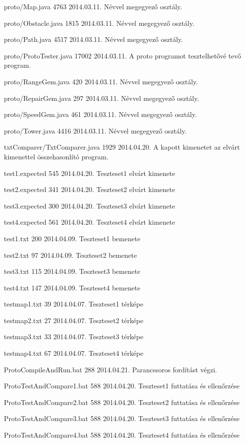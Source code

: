\begin{fajllista}
\fajl
{proto/Map.java}
{4763}
{2014.03.11.}
{Névvel megegyező osztály.}

\fajl
{proto/Obstacle.java}
{1815}
{2014.03.11.}
{Névvel megegyező osztály.}

\fajl
{proto/Path.java}
{4517}
{2014.03.11.}
{Névvel megegyező osztály.}

\fajl
{proto/ProtoTester.java}
{17002}
{2014.03.11.}
{A proto programot tesztelhetővé tevő program.}

\fajl
{proto/RangeGem.java}
{420}
{2014.03.11.}
{Névvel megegyező osztály.}

\fajl
{proto/RepairGem.java}
{297}
{2014.03.11.}
{Névvel megegyező osztály.}

\fajl
{proto/SpeedGem.java}
{461}
{2014.03.11.}
{Névvel megegyező osztály.}

\fajl
{proto/Tower.java}
{4416}
{2014.03.11.}
{Névvel megegyező osztály.}

\fajl
{txtComparer/TxtComparer.java}
{1929}
{2014.04.20.}
{A kapott kimenetet az elvárt kimenettel összehasonlító program.}

\fajl
{test1.expected}
{545}
{2014.04.20.}
{Teszteset1 elvárt kimenete}

\fajl
{test2.expected}
{341}
{2014.04.20.}
{Teszteset2 elvárt kimenete}

\fajl
{test3.expected}
{300}
{2014.04.20.}
{Teszteset3 elvárt kimenete}

\fajl
{test4.expected}
{561}
{2014.04.20.}
{Teszteset4 elvárt kimenete}

\fajl
{test1.txt}
{200}
{2014.04.09.}
{Teszteset1 bemenete}

\fajl
{test2.txt}
{97}
{2014.04.09.}
{Teszteset2 bemenete}

\fajl
{test3.txt}
{115}
{2014.04.09.}
{Teszteset3 bemenete}

\fajl
{test4.txt}
{147}
{2014.04.09.}
{Teszteset4 bemenete}

\fajl
{testmap1.txt}
{39}
{2014.04.07.}
{Teszteset1 térképe}

\fajl
{testmap2.txt}
{27}
{2014.04.07.}
{Teszteset2 térképe}

\fajl
{testmap3.txt}
{33}
{2014.04.07.}
{Teszteset3 térképe}

\fajl
{testmap4.txt}
{67}
{2014.04.07.}
{Teszteset4 térképe}

\fajl
{ProtoCompileAndRun.bat}
{288}
{2014.04.21.}
{Parancssoros fordítást végzi.}

\fajl
{ProtoTestAndCompare1.bat}
{588}
{2014.04.20.}
{Teszteset1 futtatása és ellenőrzése}

\fajl
{ProtoTestAndCompare2.bat}
{588}
{2014.04.20.}
{Teszteset2 futtatása és ellenőrzése}

\fajl
{ProtoTestAndCompare3.bat}
{588}
{2014.04.20.}
{Teszteset3 futtatása és ellenőrzése}

\fajl
{ProtoTestAndCompare4.bat}
{588}
{2014.04.20.}
{Teszteset4 futtatása és ellenőrzése}

\end{fajllista}

